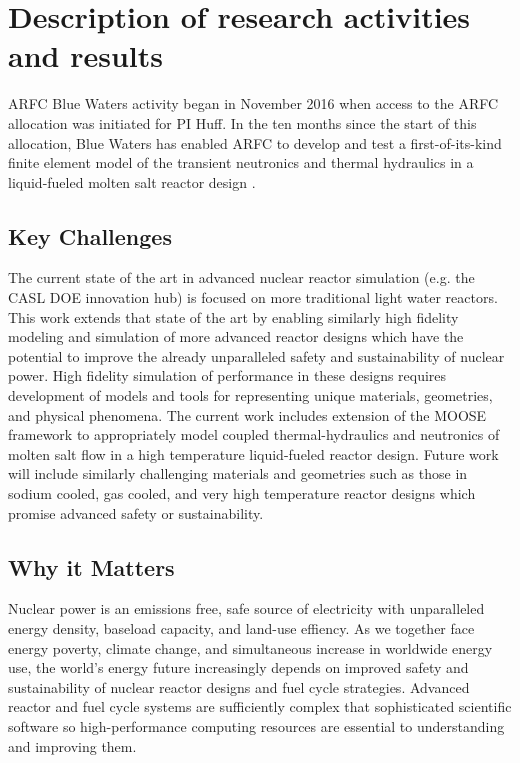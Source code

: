 \documentclass[letterpaper]{article}
\begin{document}
\section{Description of research activities and results}

ARFC Blue Waters activity began in November 2016 when access to the ARFC 
allocation was initiated for PI Huff. In the ten months since the start of 
this allocation, Blue Waters has enabled ARFC to develop and test a 
first-of-its-kind finite element model of the transient neutronics and thermal 
hydraulics in a liquid-fueled molten salt reactor design 
\cite{lindsay_arfc/moltres:_2017}. 

\subsection{Key Challenges}
The current state of the art in advanced nuclear reactor simulation (e.g. the
CASL DOE innovation hub) is focused on more traditional light water reactors.
This work extends that state of the art by enabling similarly high fidelity
modeling and simulation of more advanced reactor designs which have the
potential to improve the already unparalleled safety and sustainability of
nuclear power. High fidelity simulation of performance in these designs
requires development of models and tools for representing unique materials,
geometries, and physical phenomena.  The current work includes extension of the
MOOSE framework to appropriately model coupled thermal-hydraulics and
neutronics of molten salt flow in a high temperature liquid-fueled reactor
design. Future work will include similarly challenging materials and geometries
such as those in sodium cooled, gas cooled, and very high temperature reactor
designs which promise advanced safety or sustainability.

\subsection{Why it Matters} 


Nuclear power is an emissions free, safe source of electricity with
unparalleled energy density, baseload capacity, and land-use effiency. 
As we together face energy poverty, climate change, and simultaneous increase
in worldwide energy use, the world's energy future increasingly depends on
improved safety and sustainability of nuclear reactor designs and fuel cycle
strategies. Advanced reactor and fuel cycle systems are sufficiently complex
that sophisticated scientific software so high-performance computing resources
are essential to understanding and improving them.
\end{document}
